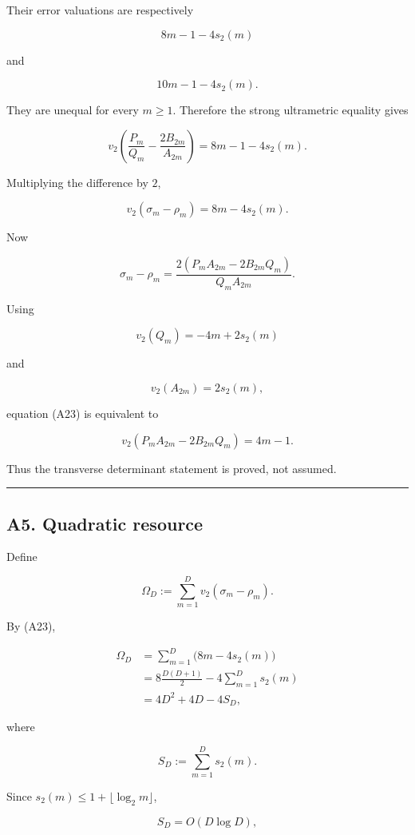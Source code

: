 \documentclass[
  10pt,
  letterpaper,
]{article}
\theoremstyle{definition}
\theoremstyle{remark}
\begin{document}
Their error valuations are respectively

\[
8m-1-4s_2(m)
\]

and

\[
10m-1-4s_2(m).
\]

They are unequal for every \(m\ge1\). Therefore the strong ultrametric
equality gives

\[
v_2\!\left(
\frac{P_m}{Q_m}
-
\frac{2B_{2m}}{A_{2m}}
\right)
=
8m-1-4s_2(m).
\]

Multiplying the difference by \(2\),

\[
\boxed{
v_2(\sigma_m-\rho_m)
=
8m-4s_2(m).
}
\tag{A23}
\]

Now

\[
\sigma_m-\rho_m
=
\frac{
2(P_mA_{2m}-2B_{2m}Q_m)
}{
Q_mA_{2m}
}.
\]

Using

\[
v_2(Q_m)=-4m+2s_2(m)
\]

and

\[
v_2(A_{2m})=2s_2(m),
\]

equation (A23) is equivalent to

\[
\boxed{
v_2(P_mA_{2m}-2B_{2m}Q_m)
=
4m-1.
}
\tag{A24}
\]

Thus the transverse determinant statement is proved, not assumed.

\begin{center}\rule{0.5\linewidth}{0.5pt}\end{center}

\subsection{A5. Quadratic resource}\label{a5.-quadratic-resource}

Define

\[
\Omega_D
:=
\sum_{m=1}^{D}
v_2(\sigma_m-\rho_m).
\]

By (A23),

\[
\begin{aligned}
\Omega_D
&=
\sum_{m=1}^{D}
\bigl(8m-4s_2(m)\bigr)
\\
&=
8\frac{D(D+1)}2
-
4\sum_{m=1}^{D}s_2(m)
\\
&=
\boxed{
4D^2+4D-4S_D,
}
\end{aligned}
\]

where

\[
S_D:=\sum_{m=1}^{D}s_2(m).
\]

Since \(s_2(m)\le 1+\lfloor\log_2m\rfloor\),

\[
S_D=O(D\log D),
\]
\end{document}
